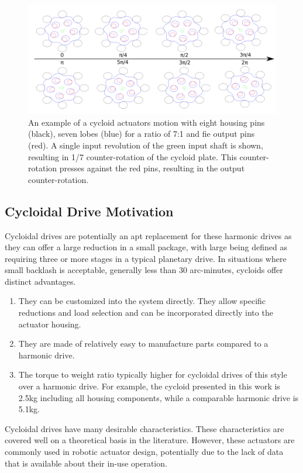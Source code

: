\begin{figure}[t]
	\centering
	\includegraphics[width=0.8\linewidth]{images/single_motion}
	\caption{An example of a cycloid actuators motion with eight housing pins (black), seven lobes (blue) for a ratio of 7:1 and fie output pins (red). A single input revolution of the green input shaft is shown, resulting in 1/7 counter-rotation of the cycloid plate. This counter-rotation presses against the red pins, resulting in the output counter-rotation. 
	}
	\label{cycloid_motion}
\end{figure}

\subsection{Cycloidal Drive Motivation}

Cycloidal drives are potentially an apt replacement for these harmonic drives as they can offer a large reduction in a small package, with large being defined as requiring three or more stages in a typical planetary drive. 
In situations where small backlash is acceptable, generally less than 30 arc-minutes, cycloids offer distinct advantages.

\begin{enumerate}
\item
They can be customized into the system directly. They allow specific reductions and load selection and can be incorporated directly into the actuator housing.
\item
They are made of relatively easy to manufacture parts compared to a harmonic drive.
\item
The torque to weight ratio typically higher for cycloidal drives of this style over a harmonic drive.
For example, the cycloid presented in this work is 2.5kg including all housing components, while a comparable harmonic drive is 5.1kg.
\end{enumerate}

Cycloidal drives have many desirable characteristics. These characteristics are covered well on a theoretical basis in the literature. However, these actuators are commonly used in robotic actuator design, potentially due to the lack of data that is available about their in-use operation.

